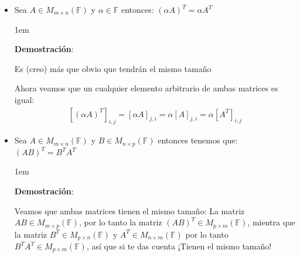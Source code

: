 \documentclass[12pt]{report}                                    %
\newenvironment{SmallIndentation}[1][0.75em]                    %
    {\begin{adjustwidth}{#1}{}\begin{footnotesize}}                 %
    {\end{footnotesize}\end{adjustwidth}}                           %
\begin{document}
\begin{itemize}
\begin{SmallIndentation}[1em]
                        \end{SmallIndentation}

                    \item Sea $A \in M_{m \times n}(\mathbb{F})$ y $\alpha \in \mathbb{F}$ entonces:
                        $(\alpha A)^T = \alpha A^T$
                        
                        \begin{SmallIndentation}[1em]
                            \textbf{Demostración}:

                            Es (creo) más que obvio que tendrán el mismo tamaño

                            Ahora veamos que un cualquier elemento arbitrario de ambas matrices es igual:
                            \begin{equation*}
                            \begin{split}
                                [(\alpha A)^T]_{i, j}    
                                    = [\alpha A]_{j, i}               
                                    = \alpha [A]_{j, i}
                                = \alpha [A^T]_{i, j}
                            \end{split}
                            \end{equation*}

                        \end{SmallIndentation}
                                    


                    \item Sea $A \in M_{m \times n}(\mathbb{F})$ y $B \in M_{n \times p}(\mathbb{F})$
                        entonces tenemos que: $(AB)^T = B^T A^T$

                        \begin{SmallIndentation}[1em]
                            \textbf{Demostración}:

                            Veamos que ambas matrices tienen el mismo tamaño: 
                            La matriz $AB \in M_{m \times p}(\mathbb{F})$, por lo tanto la matriz
                            $(AB)^T \in M_{p \times m}(\mathbb{F})$, mientra que la matriz 
                            $B^T \in M_{p \times n}(\mathbb{F})$ y $A^T \in M_{n \times m}(\mathbb{F})$
                            por lo tanto $B^T A^T \in M_{p \times m}(\mathbb{F})$, así que si te das
                            cuenta ¡Tienen el mismo tamaño!


\end{SmallIndentation}
\end{itemize}
\end{document}
